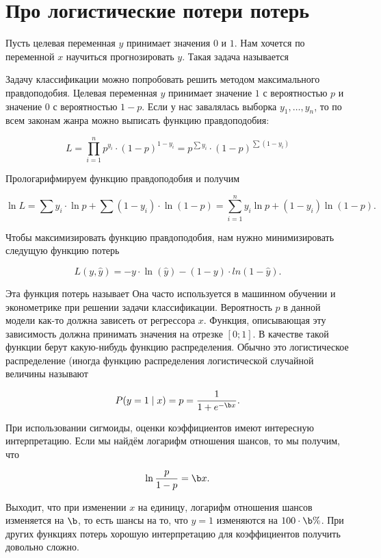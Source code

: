 \documentclass[12pt, a4paper, oneside]{article}
\begin{document}
\section{Про логистические потери потерь}

Пусть целевая переменная $y$ принимает значения $0$ и $1$.  Нам хочется по переменной $x$ научиться прогнозировать $y$. Такая задача называется   

Задачу классификации можно попробовать решить методом максимального правдоподобия. Целевая переменная $y$ принимает значение $1$ с вероятностью $p$ и значение $0$ с вероятностью $1-p$.  Если у нас завалялась выборка $y_1, \ldots, y_n$, то по всем законам жанра можно выписать функцию правдоподобия:

\[ L = \prod_{i=1}^n {p^{y_i} \cdot (1-p)^{1-y_i} }= p^{\sum y_i} \cdot (1 - p)^{\sum (1 - y_i)}\]

Прологарифмируем функцию правдоподобия и получим

\[ \ln L = \sum y_i \cdot \ln p + \sum(1 - y_i) \cdot \ln (1-p) = \sum_{i=1}^n y_i \ln p + (1- y_i) \ln (1-p).\]

Чтобы максимизировать функцию правдоподобия, нам нужно минимизировать следущую функцию потерь

\[L(y, \hat y) = -y \cdot \ln (\hat  y) - (1-y) \cdot ln(1 - \hat y). \]

Эта функция потерь называет  Она часто используется в машинном обучении и эконометрике при решении задачи классификации.  Вероятность $p$ в данной модели как-то должна зависеть от регрессора $x$.  Функция, описывающая эту зависимость должна принимать значения на отрезке $[0;1]$. В качестве такой функции берут какую-нибудь функцию распределения.  Обычно это логистическое распределение (иногда функцию распределения логистической случайной величины называют 

\[ P(y = 1 \mid x) = p =  \frac{1}{1 + e^{-\b x}}.\]

При использовании сигмоиды, оценки коэффициентов имеют интересную интерпретацию. Если мы найдём логарифм отношения шансов, то мы получим, что

\[ \ln \frac{p}{1-p} = \b x. \]

Выходит, что при изменении $x$ на единицу, логарифм отношения шансов изменяется на $\b$, то есть шансы на то, что $y=1$ изменяются на $100 \cdot \b \%$. При других функциях потерь хорошую интерпретацию для коэффициентов получить довольно сложно.
\end{document}
